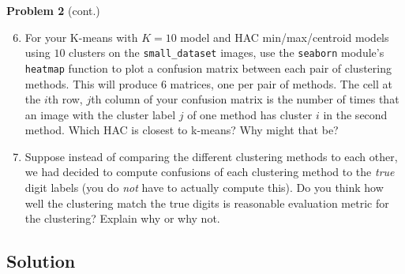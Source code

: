 \documentclass[submit]{harvardml}
\begin{document}
\newpage
\begin{framed}
\noindent\textbf{Problem 2} (cont.)\\
\begin{enumerate}
\setcounter{enumi}{5}
\item For your K-means with $K = 10$ model and HAC min/max/centroid
  models using $10$ clusters on the \texttt{small\_dataset} images,
  use the \texttt{seaborn} module's \texttt{heatmap} function to plot
  a confusion matrix between each pair of clustering methods.  This
  will produce 6 matrices, one per pair of methods. The cell at the
  $i$th row, $j$th column of your confusion matrix is the number of
  times that an image with the cluster label $j$ of one method has
  cluster $i$ in the second method.  Which HAC is closest to k-means?
  Why might that be?

\item Suppose instead of comparing the different clustering methods to
  each other, we had decided to compute confusions of each clustering
  method to the \emph{true} digit labels (you do \emph{not} have to
  actually compute this).  Do you think how well the clustering match
  the true digits is reasonable evaluation metric for the clustering?
  Explain why or why not.
  
\end{enumerate}
\end{framed}


\subsection*{Solution}
\end{document}
